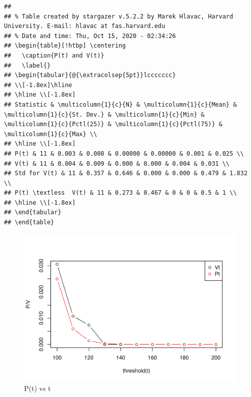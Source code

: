 \documentclass[11pt,]{article}
\begin{document}
\begin{verbatim}
## 
## % Table created by stargazer v.5.2.2 by Marek Hlavac, Harvard University. E-mail: hlavac at fas.harvard.edu
## % Date and time: Thu, Oct 15, 2020 - 02:34:26
## \begin{table}[!htbp] \centering 
##   \caption{P(t) and V(t)} 
##   \label{} 
## \begin{tabular}{@{\extracolsep{5pt}}lccccccc} 
## \\[-1.8ex]\hline 
## \hline \\[-1.8ex] 
## Statistic & \multicolumn{1}{c}{N} & \multicolumn{1}{c}{Mean} & \multicolumn{1}{c}{St. Dev.} & \multicolumn{1}{c}{Min} & \multicolumn{1}{c}{Pctl(25)} & \multicolumn{1}{c}{Pctl(75)} & \multicolumn{1}{c}{Max} \\ 
## \hline \\[-1.8ex] 
## P(t) & 11 & 0.003 & 0.008 & 0.00000 & 0.00000 & 0.001 & 0.025 \\ 
## V(t) & 11 & 0.004 & 0.009 & 0.000 & 0.000 & 0.004 & 0.031 \\ 
## Std for V(t) & 11 & 0.357 & 0.646 & 0.000 & 0.000 & 0.479 & 1.832 \\ 
## P(t) \textless  V(t) & 11 & 0.273 & 0.467 & 0 & 0 & 0.5 & 1 \\ 
## \hline \\[-1.8ex] 
## \end{tabular} 
## \end{table}
\end{verbatim}

\begin{figure}
\centering
\includegraphics{figs/unnamed-chunk-19.pdf}
\caption{P(t) vs t}
\end{figure}
\end{document}
